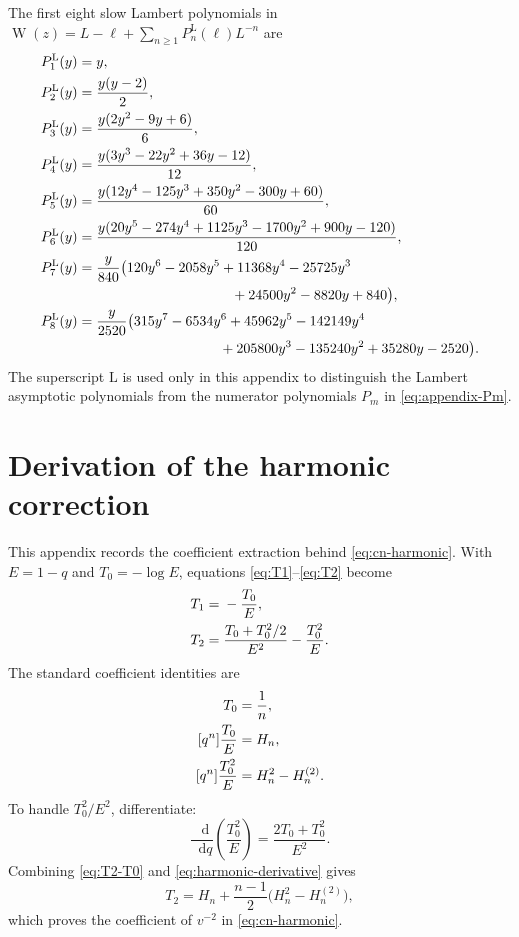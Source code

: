 \documentclass[11pt,oneside]{article}
\theoremstyle{plain}
\theoremstyle{definition}
\theoremstyle{remark}
\newcommand{\W}{\operatorname{W}}
\newcommand{\dd}{\mathop{}\!\mathrm{d}}
\begin{document}
The first eight slow Lambert polynomials in
\(\W(z)=L-\ell+\sum_{n\ge1}P_n^{\mathrm{L}}(\ell)L^{-n}\) are
\begin{align}
 P_1^{\mathrm{L}}(y)={}&y,\notag\\
 P_2^{\mathrm{L}}(y)={}&\frac{y(y-2)}2,\notag\\
 P_3^{\mathrm{L}}(y)={}&\frac{y(2y^2-9y+6)}6,\notag\\
 P_4^{\mathrm{L}}(y)={}&\frac{y(3y^3-22y^2+36y-12)}{12},\notag\\
 P_5^{\mathrm{L}}(y)={}&\frac{y(12y^4-125y^3+350y^2-300y+60)}{60},\notag\\
 P_6^{\mathrm{L}}(y)={}&\frac{y(20y^5-274y^4+1125y^3-1700y^2+900y-120)}{120},\notag\\
 P_7^{\mathrm{L}}(y)={}&\frac{y}{840}
 \bigl(120y^6-2058y^5+11368y^4-25725y^3\notag\\
 &\hspace{34mm}{}+24500y^2-8820y+840\bigr),\notag\\
 P_8^{\mathrm{L}}(y)={}&\frac{y}{2520}
 \bigl(315y^7-6534y^6+45962y^5-142149y^4\notag\\
 &\hspace{31mm}{}+205800y^3-135240y^2+35280y-2520\bigr).
 \label{eq:Lambert-polys-8}
\end{align}
The superscript \(\mathrm{L}\) is used only in this appendix to distinguish the
Lambert asymptotic polynomials from the numerator polynomials \(P_m\) in
\eqref{eq:appendix-Pm}.

\section{Derivation of the harmonic correction}
\label{app:harmonic}

This appendix records the coefficient extraction behind
\eqref{eq:cn-harmonic}.  With \(E=1-q\) and
\(T_0=-\log E\), equations \eqref{eq:T1}--\eqref{eq:T2} become
\begin{align}
 T_1={}&-\frac{T_0}{E},\notag\\
 T_2={}&\frac{T_0+T_0^2/2}{E^2}-\frac{T_0^2}{E}.
 \label{eq:T2-T0}
\end{align}
The standard coefficient identities are
\begin{align}
 [q^n]T_0={}&\frac1n,\notag\\
 [q^n]\frac{T_0}{E}={}&H_n,\notag\\
 [q^n]\frac{T_0^2}{E}={}&H_n^2-H_n^{(2)}.
 \label{eq:standard-harmonic-coeffs}
\end{align}
To handle \(T_0^2/E^2\), differentiate:
\begin{equation}
 \frac{\dd}{\dd q}\left(\frac{T_0^2}{E}\right)
 =\frac{2T_0+T_0^2}{E^2}.
 \label{eq:harmonic-derivative}
\end{equation}
Combining \eqref{eq:T2-T0} and \eqref{eq:harmonic-derivative} gives
\begin{equation}
 [q^n]T_2
 =H_n+\frac{n-1}{2}\bigl(H_n^2-H_n^{(2)}\bigr),
 \label{eq:T2-coeff}
\end{equation}
which proves the coefficient of \(v^{-2}\) in \eqref{eq:cn-harmonic}.
\end{document}
